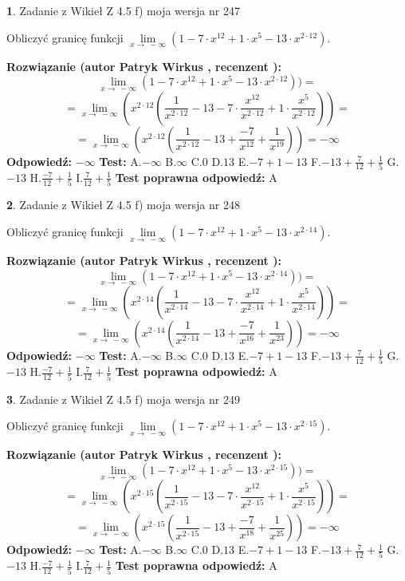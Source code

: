 \documentclass[12pt, a4paper]{article}
\theoremstyle{definition} %
\newtheorem{zad}{}
\newcommand{\zadStart}[1]{\begin{zad}#1\newline}
\newcommand{\zadStop}{\end{zad}}
\newcommand{\rozwStart}[2]{\noindent \textbf{Rozwiązanie (autor #1 , recenzent #2): }\newline}
\newcommand{\rozwStop}{\newline}
\newcommand{\odpStart}{\noindent \textbf{Odpowiedź:}\newline}
\newcommand{\odpStop}{\newline}
\newcommand{\testStart}{\noindent \textbf{Test:}\newline}
\newcommand{\testStop}{\newline}
\newcommand{\kluczStart}{\noindent \textbf{Test poprawna odpowiedź:}\newline}
\newcommand{\kluczStop}{\newline}
\begin{document}
\zadStart{Zadanie z Wikieł Z 4.5 f) moja wersja nr 247}



Obliczyć granicę funkcji  $\lim\limits_{x\to\ -\infty}(1 - 7 \cdot x^{12}+1 \cdot x^{5}- 13 \cdot x^{2\cdot12})$.
\zadStop
\rozwStart{Patryk Wirkus}{}
$$\lim\limits_{x\to\ -\infty}(1 - 7 \cdot x^{12}+1 \cdot x^{5}- 13 \cdot x^{2\cdot12}))=$$
$$=\lim\limits_{x\to\ -\infty}(x^{2\cdot12}(\frac{1}{x^{2\cdot12}}-13 -7 \cdot \frac{x^{12}}{x^{2\cdot12}}+1 \cdot \frac{x^{5}}{x^{2\cdot12}}))=$$
$$=\lim\limits_{x\to\ -\infty}(x^{2\cdot12}(\frac{1}{x^{2\cdot12}}-13 + \frac{-7}{x^{12}}+ \frac{1}{x^{19}}))=-\infty$$
\rozwStop
\odpStart
$-\infty$
\odpStop
\testStart
A.$-\infty$ B.$\infty$ C.$0$ D.$13$ E.$-7 + 1 - 13$
F.$-13+\frac{7}{12}+\frac{1}{5}$ G.$-13$
H.$\frac{-7}{12}+\frac{1}{5}$
I.$\frac{7}{12}+\frac{1}{5}$
\testStop
\kluczStart
A
\kluczStop



\zadStart{Zadanie z Wikieł Z 4.5 f) moja wersja nr 248}



Obliczyć granicę funkcji  $\lim\limits_{x\to\ -\infty}(1 - 7 \cdot x^{12}+1 \cdot x^{5}- 13 \cdot x^{2\cdot14})$.
\zadStop
\rozwStart{Patryk Wirkus}{}
$$\lim\limits_{x\to\ -\infty}(1 - 7 \cdot x^{12}+1 \cdot x^{5}- 13 \cdot x^{2\cdot14}))=$$
$$=\lim\limits_{x\to\ -\infty}(x^{2\cdot14}(\frac{1}{x^{2\cdot14}}-13 -7 \cdot \frac{x^{12}}{x^{2\cdot14}}+1 \cdot \frac{x^{5}}{x^{2\cdot14}}))=$$
$$=\lim\limits_{x\to\ -\infty}(x^{2\cdot14}(\frac{1}{x^{2\cdot14}}-13 + \frac{-7}{x^{16}}+ \frac{1}{x^{23}}))=-\infty$$
\rozwStop
\odpStart
$-\infty$
\odpStop
\testStart
A.$-\infty$ B.$\infty$ C.$0$ D.$13$ E.$-7 + 1 - 13$
F.$-13+\frac{7}{12}+\frac{1}{5}$ G.$-13$
H.$\frac{-7}{12}+\frac{1}{5}$
I.$\frac{7}{12}+\frac{1}{5}$
\testStop
\kluczStart
A
\kluczStop



\zadStart{Zadanie z Wikieł Z 4.5 f) moja wersja nr 249}



Obliczyć granicę funkcji  $\lim\limits_{x\to\ -\infty}(1 - 7 \cdot x^{12}+1 \cdot x^{5}- 13 \cdot x^{2\cdot15})$.
\zadStop
\rozwStart{Patryk Wirkus}{}
$$\lim\limits_{x\to\ -\infty}(1 - 7 \cdot x^{12}+1 \cdot x^{5}- 13 \cdot x^{2\cdot15}))=$$
$$=\lim\limits_{x\to\ -\infty}(x^{2\cdot15}(\frac{1}{x^{2\cdot15}}-13 -7 \cdot \frac{x^{12}}{x^{2\cdot15}}+1 \cdot \frac{x^{5}}{x^{2\cdot15}}))=$$
$$=\lim\limits_{x\to\ -\infty}(x^{2\cdot15}(\frac{1}{x^{2\cdot15}}-13 + \frac{-7}{x^{18}}+ \frac{1}{x^{25}}))=-\infty$$
\rozwStop
\odpStart
$-\infty$
\odpStop
\testStart
A.$-\infty$ B.$\infty$ C.$0$ D.$13$ E.$-7 + 1 - 13$
F.$-13+\frac{7}{12}+\frac{1}{5}$ G.$-13$
H.$\frac{-7}{12}+\frac{1}{5}$
I.$\frac{7}{12}+\frac{1}{5}$
\testStop
\kluczStart
A
\kluczStop
\end{document}
